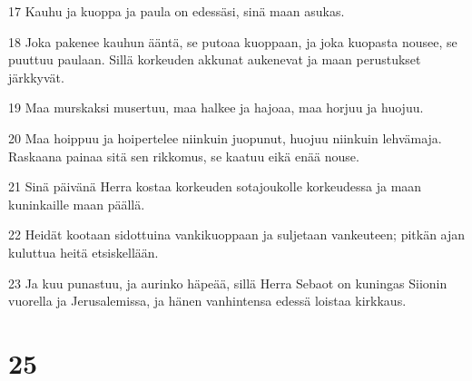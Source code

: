 \par 17 Kauhu ja kuoppa ja paula on edessäsi, sinä maan asukas.
\par 18 Joka pakenee kauhun ääntä, se putoaa kuoppaan, ja joka kuopasta nousee, se puuttuu paulaan. Sillä korkeuden akkunat aukenevat ja maan perustukset järkkyvät.
\par 19 Maa murskaksi musertuu, maa halkee ja hajoaa, maa horjuu ja huojuu.
\par 20 Maa hoippuu ja hoipertelee niinkuin juopunut, huojuu niinkuin lehvämaja. Raskaana painaa sitä sen rikkomus, se kaatuu eikä enää nouse.
\par 21 Sinä päivänä Herra kostaa korkeuden sotajoukolle korkeudessa ja maan kuninkaille maan päällä.
\par 22 Heidät kootaan sidottuina vankikuoppaan ja suljetaan vankeuteen; pitkän ajan kuluttua heitä etsiskellään.
\par 23 Ja kuu punastuu, ja aurinko häpeää, sillä Herra Sebaot on kuningas Siionin vuorella ja Jerusalemissa, ja hänen vanhintensa edessä loistaa kirkkaus.

\chapter{25}

